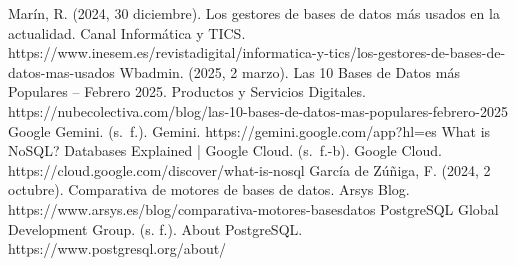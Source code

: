 \documentclass[12pt]{report}
\begin{document}
\begin{thebibliography}{99}
        Marín, R. (2024, 30 diciembre). Los gestores de bases de datos más usados en la actualidad. Canal Informática y TICS. https://www.inesem.es/revistadigital/informatica-y-tics/los-gestores-de-bases-de-datos-mas-usados
        Wbadmin. (2025, 2 marzo). Las 10 Bases de Datos más Populares – Febrero 2025. Productos y Servicios Digitales. https://nubecolectiva.com/blog/las-10-bases-de-datos-mas-populares-febrero-2025
        Google Gemini. (s. f.). Gemini. https://gemini.google.com/app?hl=es
        What is NoSQL? Databases Explained | Google Cloud. (s. f.-b). Google Cloud. https://cloud.google.com/discover/what-is-nosql
        García de Zúñiga, F. (2024, 2 octubre). Comparativa de motores de bases de datos. Arsys Blog. https://www.arsys.es/blog/comparativa-motores-basesdatos
        PostgreSQL Global Development Group. (s. f.). About PostgreSQL. https://www.postgresql.org/about/
\end{thebibliography}
\end{document}
